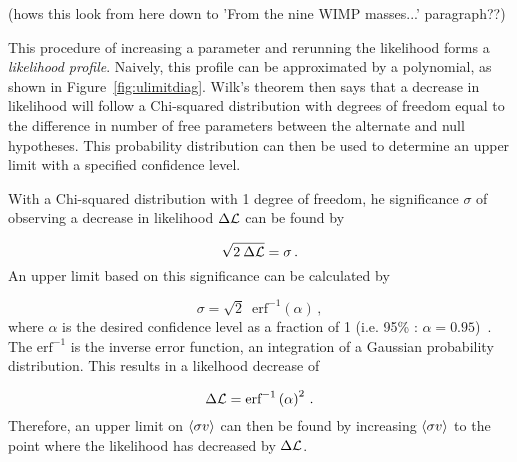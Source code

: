 {\color{red}(hows this look from here down to 'From the nine WIMP masses...' paragraph??)}

This procedure of increasing a parameter and rerunning the likelihood forms a \textit{likelihood profile}.
Naively, this profile can be approximated by a polynomial, as shown in Figure~\ref{fig:ulimitdiag}.
Wilk's theorem then says that a decrease in likelihood will follow a Chi-squared distribution with degrees of freedom equal to the difference in number of free parameters between the alternate and null hypotheses.
This probability distribution can then be used to determine an upper limit with a specified confidence level.

With a Chi-squared distribution with 1 degree of freedom, he significance $\sigma$ of observing a decrease in likelihood $\Delta\mathcal{L}$ can be found by

\begin{equation}\label{eqn:likeul1}
  \sqrt{2 \: \Delta\mathcal{L}} = \sigma \,.
\end{equation}
An upper limit based on this significance can be calculated by

\begin{equation}\label{eqn:likeul2}
  \sigma = \sqrt{2} \;\: \textrm{erf}^{-1} \left ( \alpha \right ) \,,
\end{equation}
where $\alpha$ is the desired confidence level as a fraction of 1 (i.e. 95\% : $\alpha=0.95$)~\cite{wilks1938,cash1979}.
The $\textrm{erf}^{-1}$ is the inverse error function, an integration of a Gaussian probability distribution.
This results in a likelhood decrease of

\begin{equation}\label{eqn:likeul3}
  \Delta\mathcal{L} = \textrm{erf}^{-1} \left ( \alpha \right )^2 \,.
\end{equation}
Therefore, an upper limit on $\left \langle \sigma v \right \rangle$ can then be found by increasing $\left \langle \sigma v \right \rangle$ to the point where the likelihood has decreased by $\Delta\mathcal{L}$.





